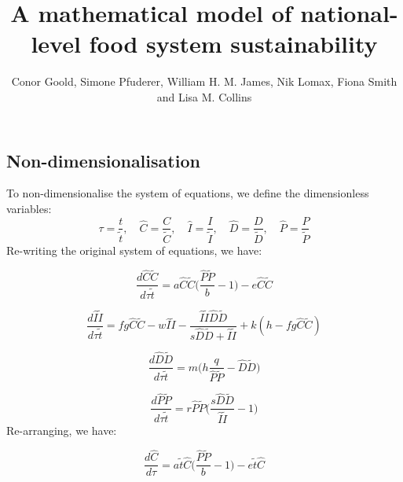 \documentclass[9pt,twoside,lineno]{pnas-new}
\title{A mathematical model of national-level food system sustainability}
\author{Conor Goold, Simone Pfuderer, William H. M. James, Nik Lomax, Fiona Smith and Lisa M. Collins}
\begin{document}

\maketitle

\SItext


\subsection*{Non-dimensionalisation}
To non-dimensionalise the system of equations, we define the dimensionless variables:
%
\begin{equation}
  \tau = \frac{t}{\tilde{t}}, \quad \hat{C} = \frac{C}{\tilde{C}}, \quad \hat{I} = \frac{I}{\tilde{I}}, \quad \hat{D} = \frac{D}{\tilde{D}}, \quad \hat{P} = \frac{P}{\tilde{P}}
\end{equation}
%
Re-writing the original system of equations, we have:

\begin{equation}
  \frac{d\hat{C} \tilde{C}}{d \tau \tilde{t}} = a \hat{C} \tilde{C} \Big(\frac{\hat{P}\tilde{P}}{b} - 1\Big) - e \hat{C} \tilde{C}
\end{equation}

\begin{equation}
  \frac{d\hat{I}\tilde{I}}{d \tau  \tilde{t}} = f g \hat{C} \tilde{C} - w \hat{I}\tilde{I} - \frac{\hat{I}\tilde{I}\hat{D}\tilde{D}}{s\hat{D}\tilde{D} + \hat{I}\tilde{I}} + k (h - f g \hat{C} \tilde{C})
\end{equation}

\begin{equation}
  \frac{d\hat{D}\tilde{D}}{d \tau \tilde{t}} = m \Big( h \frac{q}{\hat{P}\tilde{P}} - \hat{D}\tilde{D}\Big)
\end{equation}

\begin{equation}
  \frac{d\hat{P}\tilde{P}}{d \tau \tilde{t}} = r \hat{P}\tilde{P} \Big(\frac{s\hat{D}\tilde{D}}{\hat{I}\tilde{I}} - 1\Big)
\end{equation}
%
Re-arranging, we have:

\begin{equation}
  \frac{d\hat{C}}{d \tau} = a \tilde{t} \hat{C} \Big(\frac{\hat{P}\tilde{P}}{b} - 1\Big) - e \tilde{t} \hat{C}
\end{equation}
\end{document}
